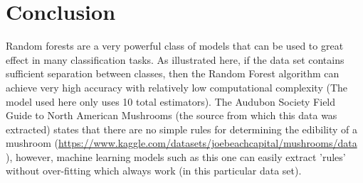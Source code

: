 \documentclass[]{article}
\begin{document}
\section{Conclusion}
Random forests are a very powerful class of models that can be used to great effect in many classification tasks. As illustrated here, if the data set contains sufficient separation between classes, then the Random Forest algorithm can achieve very high accuracy with relatively low computational complexity (The model used here only uses 10 total estimators). The Audubon Society Field Guide to North American Mushrooms (the source from which this data was extracted) states that there are no simple rules for determining the edibility of a mushroom (\url{https://www.kaggle.com/datasets/joebeachcapital/mushrooms/data}{ }), however, machine learning models such as this one can easily extract 'rules' without over-fitting which always work (in this particular data set).
\end{document}
